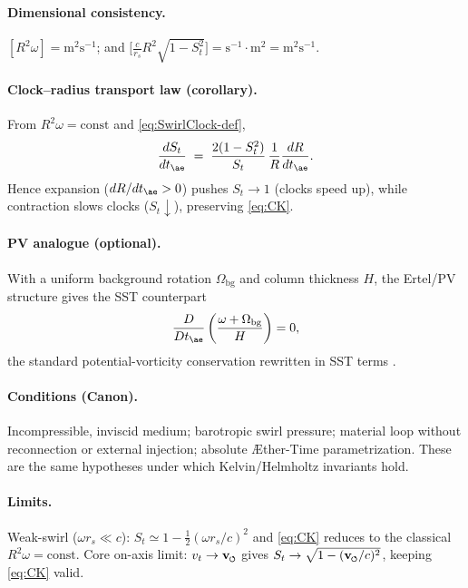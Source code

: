 \documentclass[11pt, a4paper]{article}
\newcommand{\swirlarrow}{%
    \mathchoice{\mkern-2mu\scriptstyle\boldsymbol{\circlearrowleft}}%
    {\mkern-2mu\scriptstyle\boldsymbol{\circlearrowleft}}%
    {\mkern-2mu\scriptscriptstyle\boldsymbol{\circlearrowleft}}%
    {\mkern-2mu\scriptscriptstyle\boldsymbol{\circlearrowleft}}%
}
\newcommand{\vswirl}{\mathbf{v}_{\swirlarrow}}
\begin{document}
    \paragraph{Dimensional consistency.}
    $[R^2\omega]=\text{m}^2\text{s}^{-1}$; and
    $\big[\tfrac{c}{r_s}R^2\sqrt{1-S_t^2}\big]=\text{s}^{-1}\cdot\text{m}^2=\text{m}^2\text{s}^{-1}$.

    \paragraph{Clock–radius transport law (corollary).}
    From $R^2\omega=\text{const}$ and \eqref{eq:SwirlClock-def},
    \begin{equation}
        \frac{dS_t}{dt_{\ae}} \;=\; \frac{2(1-S_t^2)}{S_t}\,\frac{1}{R}\frac{dR}{dt_{\ae}} .
        \label{eq:clock-radius-ode}
    \end{equation}
    Hence expansion ($dR/dt_{\ae}>0$) pushes $S_t\!\to\!1$ (clocks speed up), while contraction
    slows clocks ($S_t\!\downarrow$), preserving \eqref{eq:CK}.

    \paragraph{PV analogue (optional).}
    With a uniform background rotation $\Omega_{\text{bg}}$ and column thickness $H$,
    the Ertel/PV structure gives the SST counterpart
    \begin{equation}
        \frac{D}{Dt_{\ae}}
        \left(
            \frac{\omega+\Omega_{\text{bg}}}{H}
        \right)=0,
        \label{eq:PV-analogue}
    \end{equation}
    the standard potential-vorticity conservation rewritten in SST terms \cite{Ertel1942,Batchelor1967}.

    \paragraph{Conditions (Canon).}
    Incompressible, inviscid medium; barotropic swirl pressure; material loop without reconnection or
    external injection; absolute Æther-Time parametrization. These are the same hypotheses under which
    Kelvin/Helmholtz invariants hold.

    \paragraph{Limits.}
    Weak-swirl ($\omega r_s\!\ll\!c$): $S_t\simeq 1-\tfrac{1}{2}(\omega r_s/c)^2$ and \eqref{eq:CK} reduces to the
    classical $R^2\omega=\text{const}$. Core on-axis limit: $v_t\to\vswirl$ gives
    $S_t\to \sqrt{1-(\vswirl/c)^2}$, keeping \eqref{eq:CK} valid.
\end{document}
